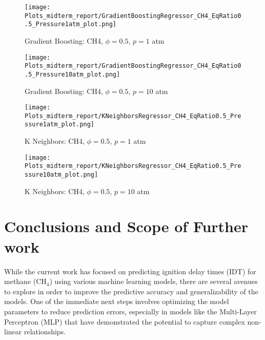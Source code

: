 \documentclass[12pt]{report}
\begin{document}







\begin{figure}[H]
    \centering
    \texttt{[image: Plots\_midterm\_report/GradientBoostingRegressor\_CH4\_EqRatio0.5\_Pressure1atm\_plot.png]}
    \caption{Gradient Boosting: CH4, $\phi = 0.5$, $p = 1$ atm}
\end{figure}


\begin{figure}[H]
    \centering
    \texttt{[image: Plots\_midterm\_report/GradientBoostingRegressor\_CH4\_EqRatio0.5\_Pressure10atm\_plot.png]}
    \caption{Gradient Boosting: CH4, $\phi = 0.5$, $p = 10$ atm}
\end{figure}


\begin{figure}[H]
    \centering
    \texttt{[image: Plots\_midterm\_report/KNeighborsRegressor\_CH4\_EqRatio0.5\_Pressure1atm\_plot.png]}
    \caption{K Neighbors: CH4, $\phi = 0.5$, $p = 1$ atm}
\end{figure}


\begin{figure}[H]
    \centering
    \texttt{[image: Plots\_midterm\_report/KNeighborsRegressor\_CH4\_EqRatio0.5\_Pressure10atm\_plot.png]}
    \caption{K Neighbors: CH4, $\phi = 0.5$, $p = 10$ atm}
\end{figure}








\chapter{Conclusions and Scope of Further work}

While the current work has focused on predicting ignition delay times (IDT) for methane (CH\(_4\)) using various machine learning models, there are several avenues to explore in order to improve the predictive accuracy and generalizability of the models. One of the immediate next steps involves optimizing the model parameters to reduce prediction errors, especially in models like the Multi-Layer Perceptron (MLP) that have demonstrated the potential to capture complex non-linear relationships.
\end{document}
